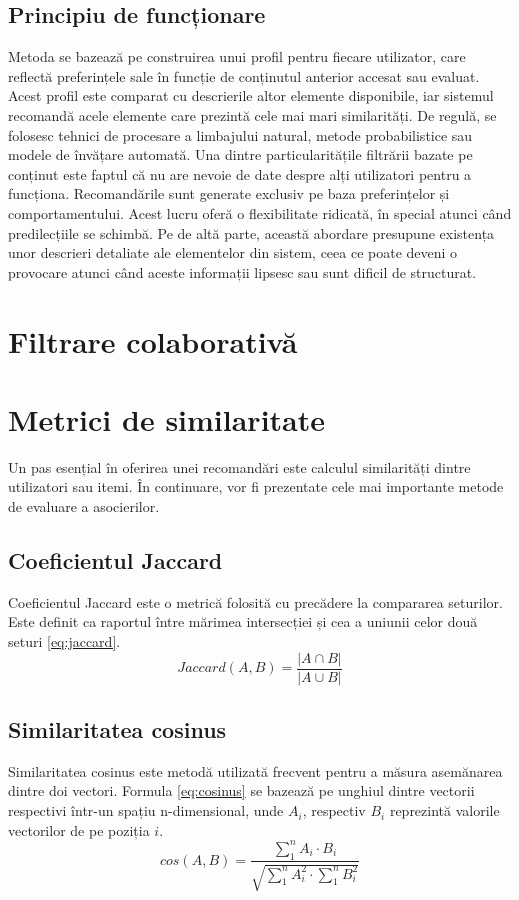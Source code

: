 \subsection{Principiu de funcționare}
Metoda se bazează pe construirea unui profil pentru fiecare utilizator, care reflectă preferințele sale în funcție de conținutul anterior accesat sau evaluat. 
Acest profil este comparat cu descrierile altor elemente disponibile, iar sistemul recomandă acele elemente care prezintă cele mai mari similarități.
De regulă, se folosesc tehnici de procesare a limbajului natural, metode probabilistice sau modele de învățare automată.
Una dintre particularitățile filtrării bazate pe conținut este faptul că nu are nevoie de date despre alți utilizatori pentru a funcționa. Recomandările sunt generate exclusiv pe baza preferințelor și comportamentului.
Acest lucru oferă o flexibilitate ridicată, în special atunci când predilecțiile se schimbă. Pe de altă parte, această abordare presupune existența unor descrieri detaliate ale elementelor din sistem, ceea ce poate deveni o provocare atunci când aceste informații lipsesc sau sunt dificil de structurat\cite{ISINKAYE2015261}.
\section{Filtrare colaborativă}
\label{sec:ch3sec2}

\section{Metrici de similaritate}
\label{sec:ch3sec3}
Un pas esențial în oferirea unei recomandări este calculul similarități dintre utilizatori sau itemi. 
În continuare, vor fi prezentate cele mai importante metode de evaluare a asocierilor\cite{sondur2016similarity}.

\subsection{Coeficientul Jaccard}
\label{subsec:ch3sec3sub1}
Coeficientul Jaccard \cite{bag2019efficient} este o metrică folosită cu precădere la compararea seturilor. 
Este definit ca raportul între mărimea intersecției și cea a uniunii celor două seturi \ref{eq:jaccard}.
\begin{equation}
    Jaccard(A, B) = \frac{|A \cap B|}{|A \cup B|}
    \label{eq:jaccard}
\end{equation}

\subsection{Similaritatea cosinus}
\label{subsec:ch3sec3sub2}
Similaritatea cosinus \cite{al2018similarity} este metodă utilizată frecvent pentru a măsura asemănarea dintre doi vectori. 
Formula \ref{eq:cosinus} se bazează pe unghiul dintre vectorii respectivi într-un spațiu n-dimensional, unde \(A_i\), respectiv \(B_i\) reprezintă valorile vectorilor de pe poziția \(i\).
\begin{equation}
    cos(A, B) = \frac{\sum_1^n A_i \cdot B_i}{\sqrt{\sum_1^n A_i^2 \cdot \sum_1^n B_i^2}}
    \label{eq:cosinus}
\end{equation}

